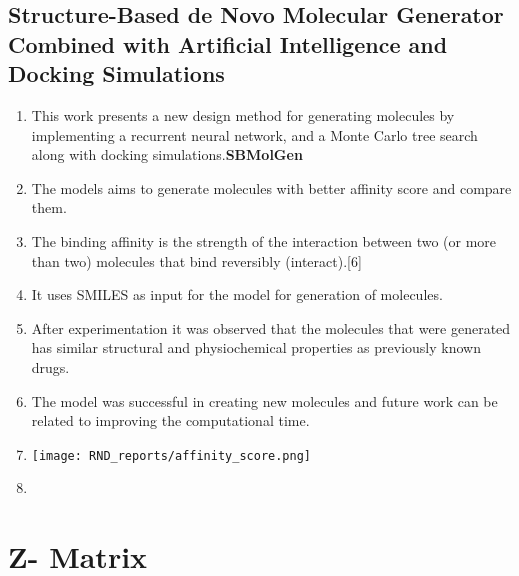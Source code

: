 \documentclass[]{report}
\begin{document}
\section{Structure-Based de Novo Molecular Generator Combined with Artificial Intelligence and Docking Simulations}
\begin{enumerate}
    \item This work presents a new design method for generating molecules by implementing a recurrent neural network, and a Monte Carlo tree search along with docking simulations.\textbf{SBMolGen}
    \item The models aims to generate molecules with better affinity score and compare them.
    \item The binding affinity is the strength of the interaction between two (or more than two) molecules that bind reversibly (interact).[6]
    \item It uses SMILES as input for the model for generation of molecules.
    \item After experimentation it was observed that the molecules that were generated has similar structural and physiochemical properties as previously known drugs.
    \item The model was successful in creating new molecules and future work can be related to improving the computational time.
    \item \texttt{[image: RND\_reports/affinity\_score.png]}
    \item 
\end{enumerate}







\chapter{Z- Matrix}
\end{document}
